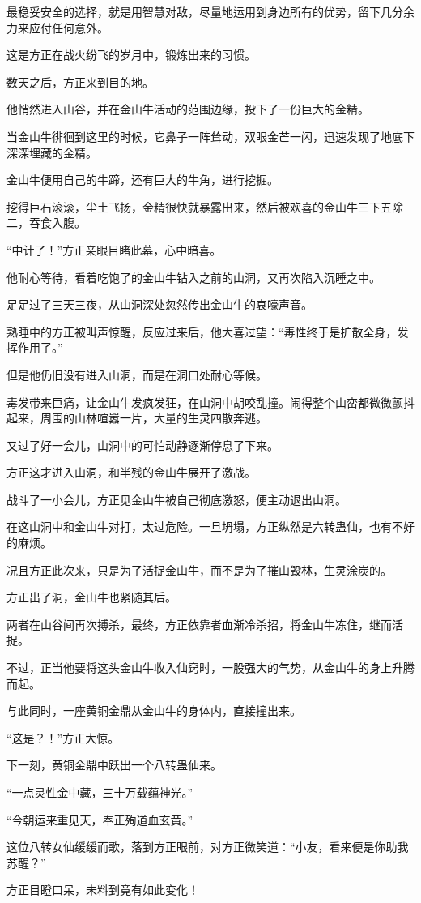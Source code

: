 \begin{this_body}
最稳妥安全的选择，就是用智慧对敌，尽量地运用到身边所有的优势，留下几分余力来应付任何意外。

这是方正在战火纷飞的岁月中，锻炼出来的习惯。

数天之后，方正来到目的地。

他悄然进入山谷，并在金山牛活动的范围边缘，投下了一份巨大的金精。

当金山牛徘徊到这里的时候，它鼻子一阵耸动，双眼金芒一闪，迅速发现了地底下深深埋藏的金精。

金山牛便用自己的牛蹄，还有巨大的牛角，进行挖掘。

挖得巨石滚滚，尘土飞扬，金精很快就暴露出来，然后被欢喜的金山牛三下五除二，吞食入腹。

“中计了！”方正亲眼目睹此幕，心中暗喜。

他耐心等待，看着吃饱了的金山牛钻入之前的山洞，又再次陷入沉睡之中。

足足过了三天三夜，从山洞深处忽然传出金山牛的哀嚎声音。

熟睡中的方正被叫声惊醒，反应过来后，他大喜过望：“毒性终于是扩散全身，发挥作用了。”

但是他仍旧没有进入山洞，而是在洞口处耐心等候。

毒发带来巨痛，让金山牛发疯发狂，在山洞中胡咬乱撞。闹得整个山峦都微微颤抖起来，周围的山林喧嚣一片，大量的生灵四散奔逃。

又过了好一会儿，山洞中的可怕动静逐渐停息了下来。

方正这才进入山洞，和半残的金山牛展开了激战。

战斗了一小会儿，方正见金山牛被自己彻底激怒，便主动退出山洞。

在这山洞中和金山牛对打，太过危险。一旦坍塌，方正纵然是六转蛊仙，也有不好的麻烦。

况且方正此次来，只是为了活捉金山牛，而不是为了摧山毁林，生灵涂炭的。

方正出了洞，金山牛也紧随其后。

两者在山谷间再次搏杀，最终，方正依靠者血渐冷杀招，将金山牛冻住，继而活捉。

不过，正当他要将这头金山牛收入仙窍时，一股强大的气势，从金山牛的身上升腾而起。

与此同时，一座黄铜金鼎从金山牛的身体内，直接撞出来。

“这是？！”方正大惊。

下一刻，黄铜金鼎中跃出一个八转蛊仙来。

“一点灵性金中藏，三十万载蕴神光。”

“今朝运来重见天，奉正殉道血玄黄。”

这位八转女仙缓缓而歌，落到方正眼前，对方正微笑道：“小友，看来便是你助我苏醒？”

方正目瞪口呆，未料到竟有如此变化！

\end{this_body}

